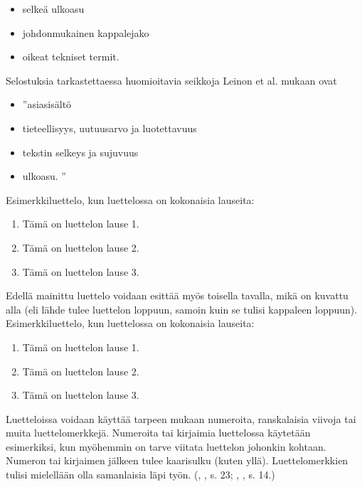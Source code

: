 \documentclass{LUT_pohja}[2016/03/09 LUT Dippa Pohja]
\begin{document}
\begin{itemize}[-]
\item selkeä ulkoasu 
\item johdonmukainen kappalejako
\item oikeat tekniset termit.
\end{itemize}
\vspace{1em}
Selostuksia tarkastettaessa huomioitavia seikkoja Leinon et al. \citeyearpar[s. 23]{Leino00} mukaan ovat 
\begin{itemize}[-]
\item ”asiasisältö
\item tieteellisyys, uutuusarvo ja luotettavuus
\item tekstin selkeys ja sujuvuus
\item ulkoasu. ”
\end{itemize}
\vspace{1em}
Esimerkkiluettelo, kun luettelossa on kokonaisia lauseita\citep[s. 23]{Leino00}:
\begin{enumerate}[1),noitemsep, nolistsep, topsep=-1em]
\item Tämä on luettelon lause 1.
\item Tämä on luettelon lause 2.
\item Tämä on luettelon lause 3.
\end{enumerate}
\vspace{1em}
Edellä mainittu luettelo voidaan esittää myös toisella tavalla, mikä on kuvattu alla (eli 
lähde tulee luettelon loppuun, samoin kuin se tulisi kappaleen loppuun). Esimerkkiluettelo, kun luettelossa on kokonaisia lauseita:
\begin{enumerate}[1),noitemsep, nolistsep, topsep=-1em]
\item Tämä on luettelon lause 1.
\item Tämä on luettelon lause 2.
\item Tämä on luettelon lause 3.
\end{enumerate}
\citep[s. 23.]{Leino00}

Luetteloissa voidaan käyttää tarpeen mukaan numeroita, ranskalaisia viivoja tai muita 
luettelomerkkejä.  Numeroita  tai kirjaimia  luettelossa käytetään esimerkiksi,  kun 
myöhemmin on tarve viitata luettelon johonkin kohtaan. Numeron tai kirjaimen jälkeen 
tulee kaarisulku (kuten yllä). Luettelomerkkien tulisi mielellään olla samanlaisia läpi työn. (\citeauthor{Leino00}, \citeyear{Leino00}, s. 23; \citeauthor{Kauppinen01a}, \citeyear{Kauppinen01a}, s. 14.)


\vspace*{\fill}%
\end{document}

